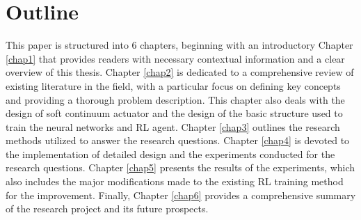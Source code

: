 \section{Outline}
This paper is structured into 6 chapters, beginning with an introductory Chapter \ref{chap1} that provides readers with necessary contextual information and a clear overview of this thesis. Chapter \ref{chap2} is dedicated to a comprehensive review of existing literature in the field, with a particular focus on defining key concepts and providing a thorough problem description. This chapter also deals with the design of soft continuum actuator and the design of the basic structure used to train the neural networks and \ac{RL} agent. Chapter \ref{chap3} outlines the research methods utilized to answer the research questions. Chapter \ref{chap4} is devoted to the implementation of detailed design and the experiments conducted for the research questions. Chapter \ref{chap5} presents the results of the experiments, which also includes the major modifications made to the existing \ac{RL} training method for the improvement. Finally, Chapter \ref{chap6} provides a comprehensive summary of the research project and its future prospects.
